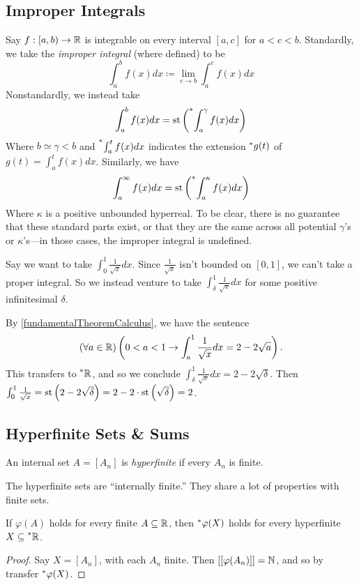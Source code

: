 \subsection{Improper Integrals}
Say $f: [a, b) \to \mathbb{R}$ is integrable on every interval $[a, c]$ for $a < c < b$. Standardly, we take the \textit{improper integral} (where defined) to be
\[\int_a^b f(x)dx \coloneq \lim_{c \to b} \int_a^c f(x)dx\]
Nonstandardly, we instead take
\[\int_a^b f(x)dx = \operatorname{st}\left(\prescript{*}{}{\int_a^\gamma f(x)dx}\right)\]
Where $b \simeq \gamma < b$ and $\prescript{*}{}{\int_a^t f(x)dx}$ indicates the extension $\prescript{*}{}{g}(t)$ of $g(t) = \int_a^t f(x)dx$. Similarly, we have
\[\int_a^\infty f(x)dx = \operatorname{st}\left(\prescript{*}{}{\int_a^\kappa f(x)dx}\right)\]
Where $\kappa$ is a positive unbounded hyperreal. To be clear, there is no guarantee that these standard parts exist, or that they are the same across all potential $\gamma$'s or $\kappa$'s---in those cases, the improper integral is undefined.

Say we want to take $\int_0^1 \frac{1}{\sqrt{x}} dx$. Since $\frac{1}{\sqrt{x}}$ isn't bounded on $[0, 1]$, we can't take a proper integral. So we instead venture to take $\int_\delta^1 \frac{1}{\sqrt{x}} dx$ for some positive infinitesimal $\delta$. 

By \ref{fundamentalTheoremCalculus}, we have the sentence
\[
(\forall a \in \mathbb{R})\left(0 < a < 1 \to \int_a^1 \frac{1}{\sqrt{x}} dx= 2 - 2 \sqrt{a}\right).
\]
This transfers to $\prescript{*}{}{\mathbb{R}}$, and so we conclude $\int_\delta^1 \frac{1}{\sqrt{x}} dx = 2 - 2\sqrt{\delta}$. Then $\int_0^1 \frac{1}{\sqrt{x}} = \operatorname{st}\left(2 - 2 \sqrt{\delta}\right) = 2 - 2 \cdot \operatorname{st}\left(\sqrt{\delta}\right) = 2$.  

\subsection{Hyperfinite Sets \& Sums}
\begin{defn}
    An internal set $A = [A_n]$ is \textit{hyperfinite} if every $A_n$ is finite.
\end{defn}

The hyperfinite sets are ``internally finite.'' They share a lot of properties with finite sets.

\begin{thm}\label{HyperfiniteTransfer}
    If $\varphi(A)$ holds for every finite $A \subseteq \mathbb{R}$, then $\prescript{*}{}{\varphi}(X)$ holds for every hyperfinite $X \subseteq \prescript{*}{}{\mathbb{R}}$.
\end{thm}

\begin{proof}
    Say $X = [A_n]$, with each $A_n$ finite. Then $[[\varphi(A_n)]] = \mathbb{N}$, and so by transfer $\prescript{*}{}{\varphi}(X)$.
\end{proof}

